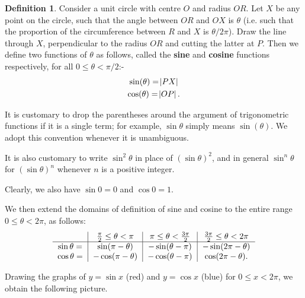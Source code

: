 \documentclass[a4paper,leqno]{article}
\numberwithin{equation}{section}
\theoremstyle{definition}
\newtheorem{defn}[equation]{Definition}
\theoremstyle{remark}
\newcommand{\df}[1]{\textbf{#1}}
\begin{document}
\begin{defn}\label{defn:trig1}
  Consider a unit circle with centre $ O $ and radius $ OR $. Let $ X $ be any point on the circle, such that the angle between $ OR $ and $ OX $
  is $ \theta $ (i.e. such that the proportion of the circumference between $ R $ and $ X $ is $ \theta/2\pi $). Draw the line through $ X $,
  perpendicular to the radius $ OR $ and cutting the latter at $ P $. Then we define two functions of $ \theta $ as follows, called the \df{sine} and \df{cosine}
  functions respectively, for all $ 0 \leq \theta < \pi/2 $:-
  \begin{gather}
    \sin(\theta) = \abs{PX}\\
    \cos(\theta) = \abs{OP}.
  \end{gather}
\end{defn}

It is customary to drop the parentheses around the argument of trigonometric functions if it is a single term; for
example, $ \sin \theta $ simply means $ \sin(\theta) $. We adopt this convention whenever it is unambiguous.

It is also customary to write $ \sin^2 \theta $ in place of $ (\sin \theta)^2 $, and in general $ \sin^n \theta $
for $ (\sin \theta)^n $ whenever $ n $ is a positive integer.

Clearly, we also have $ \sin 0 = 0 $ and $ \cos 0 = 1 $.

We then extend the domains of definition of sine and cosine to the entire range $ 0 \leq \theta < 2\pi $, as follows:
\begin{equation}\label{tab:extend1}
\begin{tabular}{c|c|c|c}
  & $ \frac{\pi}{2} \leq \theta < \pi $ & $ \pi \leq \theta < \frac{3\pi}{2} $ & $ \frac{3\pi}{2} \leq \theta < 2\pi $\\\hline
  $ \sin \theta = $ & $ \sin(\pi - \theta) $ & $ -\sin(\theta - \pi)$ & $-\sin(2\pi - \theta) $\\
  $ \cos \theta = $ & $ -\cos(\pi - \theta) $ & $ - \cos (\theta - \pi) $ & $ \cos(2\pi - \theta) $.
\end{tabular}
\end{equation}

Drawing the graphs of $ y = \sin x $ (red) and $ y = \cos x $ (blue) for $ 0 \leq x < 2\pi $, we obtain the
following picture.
\begin{center}
\end{center}
\end{document}
